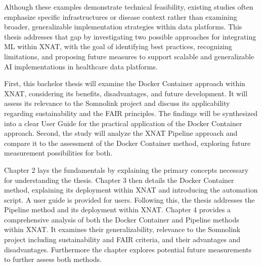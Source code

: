 Although these examples demonstrate technical feasibility, existing studies often emphasize specific infrastructures or disease context rather than examining broader, generalizable implementation strategies within data platforms. This thesis addresses that gap by investigating two possible approaches for integrating \ac{ML} within XNAT, with the goal of identifying best practices, recognizing limitations, and proposing future measures to support scalable and generalizable AI implementations in healthcare data platforms.

First, this bachelor thesis will examine the Docker Container approach within XNAT, considering its benefits, disadvantages, and future development. It will assess its relevance to the Somnolink project and discuss its applicability regarding sustainability and the FAIR principles. The findings will be synthesized into a clear User Guide for the practical application of the Docker Container approach.
Second, the study will analyze the XNAT Pipeline approach and compare it to the  assessment of the Docker Container method, exploring future measurement possibilities for both.


Chapter 2 lays the fundamentals by explaining the primary concepts necessary for understanding the thesis. Chapter 3 then details the Docker Container method, explaining its deployment within XNAT and introducing the automation script. A user guide is provided for users. Following this, the thesis addresses the Pipeline method and its deployment within XNAT. Chapter 4 provides a comprehensive analysis of both the Docker Container and Pipeline methods within XNAT. It examines their generalizability, relevance to the Somnolink project including sustainability and FAIR criteria, and their advantages and disadvantages. Furthermore the chapter explores potential future measurements to further assess both methods.



 

